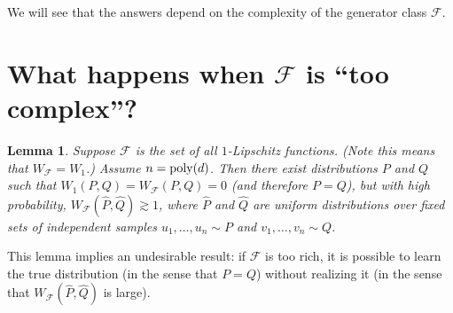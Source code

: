 \documentclass[11pt]{article}
\newcommand{\cF}{\mathcal{F}}
\newcommand{\WF}{W_{\cF}}
\newtheorem{lemma}{Lemma}
\begin{document}
We will see that the answers depend on the complexity of the generator class $\cF$.

\section{What happens when $\cF$ is ``too complex''?}
\begin{lemma}
Suppose $\cF$ is the set of all $1$-Lipschitz functions.
(Note this means that $\WF = W_1$.) Assume $n={\rm poly}(d)$.
Then there exist distributions $P$ and $Q$ such that $W_1(P,Q) = \WF(P,Q) = 0$ (and therefore $P = Q$), but with high probability, $\WF(\hat{P}, \hat{Q}) \gtrsim 1$, where $\hat{P}$ and $\hat{Q}$ are uniform distributions over fixed sets of independent samples $u_1, \dots, u_n \sim P$ and $v_1, \dots, v_n \sim Q$.
\end{lemma}
This lemma implies an undesirable result: if $\cF$ is too rich, it is possible to learn the true distribution (in the sense that $P = Q$) without realizing it (in the sense that $\WF(\hat{P}, \hat{Q})$ is large).
\end{document}
